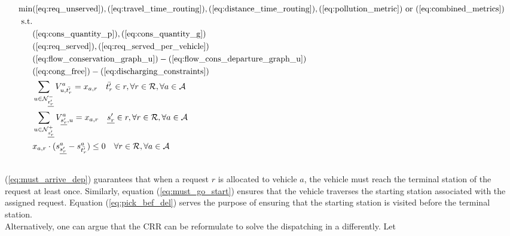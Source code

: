\begin{align}
	\text{min}&  
		(\ref{eq:req_unserved}),
		(\ref{eq:travel_time_routing}), (\ref{eq:distance_time_routing}), (\ref{eq:pollution_metric}) \text{ or } (\ref{eq:combined_metrics})
	\nonumber\\
	\text{s.t.} &\nonumber\\
	&(\ref{eq:cons_quantity_p}),(\ref{eq:cons_quantity_g})\nonumber\\	
	&(\ref{eq:req_served}),(\ref{eq:req_served_per_vehicle})\nonumber\\	
	&(\ref{eq:flow_conservation_graph_u})-(\ref{eq:flow_cons_departure_graph_u})\nonumber\\
	&(\ref{eq:cong_free})-(\ref{eq:discharging_constraints})\nonumber\\
	&\sum_{u \in \mathcal{N}^-_{\underline{t'_r}} } V^a_{u, \bar{t'_r}} = x_{a,r} \quad  \bar{t'_r} \in r, \forall r \in \mathcal{R}, \forall a \in \mathcal{A} \label{eq:must_arrive_dep}	\\
	&\sum_{u \in \mathcal{N}^+_{\underline{s'_r}} } V^a_{ \underline{s'_r}, u} = x_{a,r} \quad  \underline{s'_r} \in r, \forall r \in \mathcal{R}, \forall a \in \mathcal{A}\label{eq:must_go_start}\\
	&x_{a,r}\cdot(s_{\underline{s'_r}}^a - s_{\bar{t'_r}}^a) \leq 0 \quad \forall r \in \mathcal{R}, \forall a \in \mathcal{A}\label{eq:pick_bef_del}\\
	\nonumber
\end{align}
(\ref{eq:must_arrive_dep}) guarantees that when a request $r$ is allocated to vehicle $a$, the vehicle must reach the terminal station of the request at least once. Similarly, equation (\ref{eq:must_go_start}) ensures that the vehicle traverses the starting station associated with the assigned request. Equation (\ref{eq:pick_bef_del}) serves the purpose of ensuring that the starting station is visited before the terminal station.\\
Alternatively, one can argue that the CRR can be reformulate to solve the dispatching in a differently. Let 

